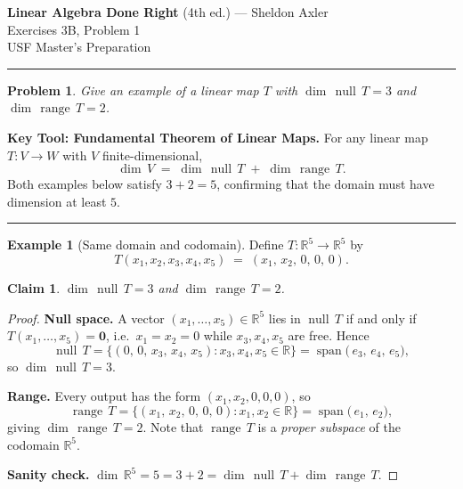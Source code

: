 \documentclass[12pt]{article}
\newtheorem*{problem}{Problem}
\newtheorem*{claim}{Claim}
\theoremstyle{definition}
\newtheorem*{example}{Example}
\theoremstyle{remark}
\newcommand{\R}{\mathbb{R}}
\newcommand{\nullT}{\operatorname{null}}
\newcommand{\range}{\operatorname{range}}
\newcommand{\dime}{\operatorname{dim}}
\begin{document}
 
\begin{center}
  {\Large \textbf{Linear Algebra Done Right} (4th ed.) --- Sheldon Axler}\\[6pt]
  {\large Exercises 3B, Problem 1}\\[4pt]
  {\normalsize USF Master's Preparation}
\end{center}
 
\hrule
\vspace{1em}
 
\begin{problem}
Give an example of a linear map $T$ with $\dime\,\nullT\,T = 3$ and
$\dime\,\range\,T = 2$.
\end{problem}
 
\vspace{0.5em}
 
\noindent\textbf{Key Tool: Fundamental Theorem of Linear Maps.}\;
For any linear map $T : V \to W$ with $V$ finite-dimensional,
\[
  \dime\,V \;=\; \dime\,\nullT\,T \;+\; \dime\,\range\,T.
\]
Both examples below satisfy $3 + 2 = 5$, confirming that the domain must have
dimension at least $5$.
 
\vspace{1em}
\hrule
\vspace{1em}
 
\begin{example}[Same domain and codomain]
Define $T : \R^5 \to \R^5$ by
\[
  T(x_1, x_2, x_3, x_4, x_5) \;=\; (x_1,\, x_2,\, 0,\, 0,\, 0).
\]
\end{example}
 
\begin{claim}
$\dime\,\nullT\,T = 3$ and $\dime\,\range\,T = 2$.
\end{claim}
 
\begin{proof}
\textbf{Null space.}
A vector $(x_1,\ldots,x_5)\in\R^5$ lies in $\nullT\,T$ if and only if
$T(x_1,\ldots,x_5) = \mathbf{0}$, i.e.\ $x_1 = x_2 = 0$ while $x_3,x_4,x_5$
are free.  Hence
\[
  \nullT\,T
  = \{(0,\,0,\,x_3,\,x_4,\,x_5) : x_3,x_4,x_5\in\R\}
  = \operatorname{span}\!\bigl(\,e_3,\,e_4,\,e_5\bigr),
\]
so $\dime\,\nullT\,T = 3$.
 
\textbf{Range.}
Every output has the form $(x_1, x_2, 0, 0, 0)$, so
\[
  \range\,T
  = \{(x_1,\,x_2,\,0,\,0,\,0) : x_1,x_2\in\R\}
  = \operatorname{span}\!\bigl(\,e_1,\,e_2\bigr),
\]
giving $\dime\,\range\,T = 2$.
Note that $\range\,T$ is a \emph{proper subspace} of the codomain $\R^5$.
 
\textbf{Sanity check.}
$\dime\,\R^5 = 5 = 3 + 2 = \dime\,\nullT\,T + \dime\,\range\,T$.\;\checkmark
\end{proof}
 
\end{document}
